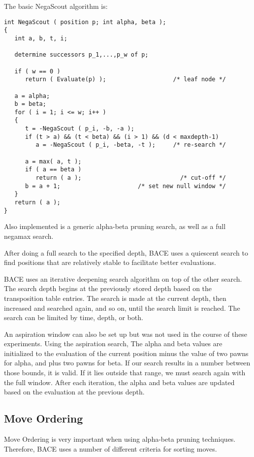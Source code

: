 \documentclass{article}
\begin{document}
The basic NegaScout algorithm is:

\begin{verbatim}
int NegaScout ( position p; int alpha, beta );   
{             
   int a, b, t, i;

   determine successors p_1,...,p_w of p;

   if ( w == 0 )
      return ( Evaluate(p) );                   /* leaf node */

   a = alpha;
   b = beta;
   for ( i = 1; i <= w; i++ )
   {
      t = -NegaScout ( p_i, -b, -a );
      if (t > a) && (t < beta) && (i > 1) && (d < maxdepth-1)
         a = -NegaScout ( p_i, -beta, -t );     /* re-search */

      a = max( a, t );
      if ( a == beta ) 
         return ( a );                            /* cut-off */
      b = a + 1;                      /* set new null window */
   }
   return ( a );
}
\end{verbatim}

Also implemented is a generic alpha-beta pruning search, as well as a
full negamax search. 

After doing a full search to the specified depth, BACE uses a quiescent
search to find positions that are relatively stable to facilitate
better evaluations.

BACE uses an iterative deepening search algorithm on top of the other
search.  The search depth begins at the previously stored depth based
on the transposition table entries.  The search is made at the current
depth, then increased and searched again, and so on, until the search
limit is reached.  The search can be limited by time, depth, or both.   

An aspiration window can also be set up but was not used in the course
of these experiments.  Using the aspiration search, The alpha and beta
values are initialized to the evaluation of the current position minus
the value of two pawns for alpha, and plus two pawns for beta.  If our
search results in a number between those bounds, it is valid.  If it
lies outside that range, we must search again with the full window.
After each iteration, the alpha and beta values are updated based on
the evaluation at the previous depth. 

\subsection{Move Ordering}

Move Ordering is very important when using alpha-beta pruning
techniques.  Therefore, BACE uses a number of different criteria for
sorting moves.
\end{document}
